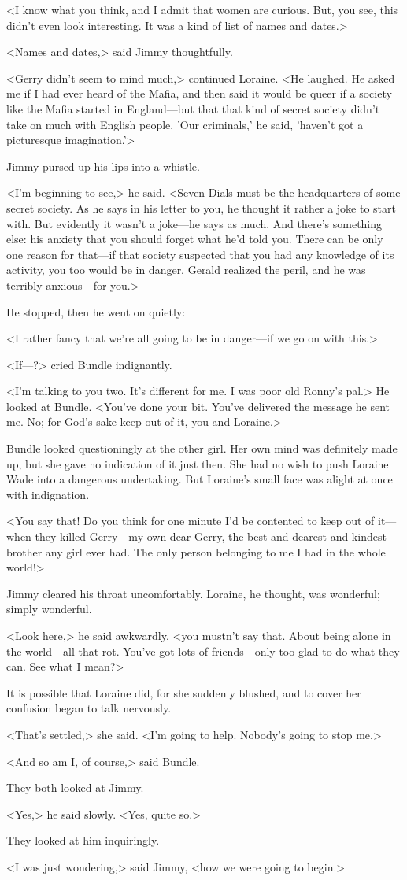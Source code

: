 <I know what you think, and I admit that women are curious. But, you see, this didn't even look interesting. It was a kind of list of names and dates.>

<Names and dates,> said Jimmy thoughtfully.

<Gerry didn't seem to mind much,> continued Loraine. <He laughed. He asked me if I had ever heard of the Mafia, and then said it would be queer if a society like the Mafia started in England—but that that kind of secret society didn't take on much with English people. 'Our criminals,' he said, 'haven't got a picturesque imagination.'>

Jimmy pursed up his lips into a whistle.

<I'm beginning to see,> he said. <Seven Dials must be the headquarters of some secret society. As he says in his letter to you, he thought it rather a joke to start with. But evidently it wasn't a joke—he says as much. And there's something else: his anxiety that you should forget what he'd told you. There can be only one reason for that—if that society suspected that you had any knowledge of its activity, you too would be in danger. Gerald realized the peril, and he was terribly anxious—for you.>

He stopped, then he went on quietly:

<I rather fancy that we're all going to be in danger—if we go on with this.>

<If—?> cried Bundle indignantly.

<I'm talking to you two. It's different for me. I was poor old Ronny's pal.> He looked at Bundle. <You've done your bit. You've delivered the message he sent me. No; for God's sake keep out of it, you and Loraine.>

Bundle looked questioningly at the other girl. Her own mind was definitely made up, but she gave no indication of it just then. She had no wish to push Loraine Wade into a dangerous undertaking. But Loraine's small face was alight at once with indignation.

<You say that! Do you think for one minute I'd be contented to keep out of it—when they killed Gerry—my own dear Gerry, the best and dearest and kindest brother any girl ever had. The only person belonging to me I had in the whole world!>

Jimmy cleared his throat uncomfortably. Loraine, he thought, was wonderful; simply wonderful.

<Look here,> he said awkwardly, <you mustn't say that. About being alone in the world—all that rot. You've got lots of friends—only too glad to do what they can. See what I mean?>

It is possible that Loraine did, for she suddenly blushed, and to cover her confusion began to talk nervously.

<That's settled,> she said. <I'm going to help. Nobody's going to stop me.>

<And so am I, of course,> said Bundle.

They both looked at Jimmy.

<Yes,> he said slowly. <Yes, quite so.>

They looked at him inquiringly.

<I was just wondering,> said Jimmy, <how we were going to begin.>